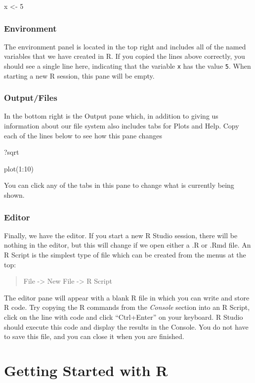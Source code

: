 \documentclass[
]{article}
\begin{document}
x \textless- 5

\subsubsection{Environment}\label{environment}

The environment panel is located in the top right and includes all of
the named variables that we have created in R. If you copied the lines
above correctly, you should see a single line here, indicating that the
variable \texttt{x} has the value \texttt{5}. When starting a new R
session, this pane will be empty.

\subsubsection{Output/Files}\label{outputfiles}

In the bottom right is the Output pane which, in addition to giving us
information about our file system also includes tabs for Plots and Help.
Copy each of the lines below to see how this pane changes

?sqrt

plot(1:10)

You can click any of the tabs in this pane to change what is currently
being shown.

\subsubsection{Editor}\label{editor}

Finally, we have the editor. If you start a new R Studio session, there
will be nothing in the editor, but this will change if we open either a
.R or .Rmd file. An R Script is the simplest type of file which can be
created from the menus at the top:

\begin{quote}
File -\textgreater{} New File -\textgreater{} R Script
\end{quote}

The editor pane will appear with a blank R file in which you can write
and store R code. Try copying the R commands from the \emph{Console}
section into an R Script, click on the line with code and click
``Ctrl+Enter'' on your keyboard. R Studio should execute this code and
display the results in the Console. You do not have to save this file,
and you can close it when you are finished.

\section{Getting Started with R}\label{getting-started-with-r}
\end{document}
